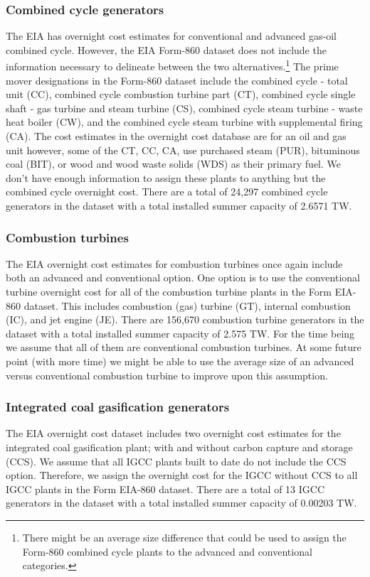 \documentclass[10pt]{report}
\begin{document}
\subsubsection{Combined cycle generators}
The EIA has overnight cost estimates for conventional and advanced gas-oil combined cycle.
However, the EIA Form-860 dataset does not include the information necessary to delineate between the two alternatives.\footnote{There might be an average size difference that could be used to assign the Form-860 combined cycle plants to the advanced and conventional categories.}
The prime mover designations in the Form-860 dataset include the combined cycle - total unit (CC), combined cycle combustion turbine part (CT), combined cycle single shaft - gas turbine and steam turbine (CS), combined cycle steam turbine - waste heat boiler (CW), and the combined cycle steam turbine with supplemental firing (CA). 
The cost estimates in the overnight cost database are for an oil and gas unit however, some of the CT, CC, CA, use purchased steam (PUR), bituminous coal (BIT), or wood and wood waste solids (WDS) as their primary fuel.  
We don't have enough information to assign these plants to anything but the combined cycle overnight cost. 
There are a total of 24,297 combined cycle generators in the dataset with a total installed summer capacity of 2.6571 TW. 

\subsubsection{Combustion turbines}
The EIA overnight cost estimates for combustion turbines once again include both an advanced and conventional option. 
One option is to use the conventional turbine overnight cost for all of the combustion turbine plants in the Form EIA-860 dataset. 
This includes combustion (gas) turbine (GT), internal combustion (IC), and jet engine (JE).
There are 156,670 combustion turbine generators in the dataset with a total installed summer capacity of  2.575 TW. 
For the time being we assume that all of them are conventional combustion turbines. 
At some future point (with more time) we might be able to use the average size of an advanced versus conventional combustion turbine to improve upon this assumption. 

\subsubsection{Integrated coal gasification generators}
The EIA overnight cost dataset includes two overnight cost estimates for the integrated coal gasification plant; with and without carbon capture and storage (CCS). 
We assume that all IGCC plants built to date do not include the CCS option. 
Therefore, we assign the overnight cost for the IGCC without CCS to all IGCC plants in the Form EIA-860 dataset. 
There are a total of 13 IGCC generators in the dataset with a total installed summer capacity of 0.00203 TW. 
\end{document}
